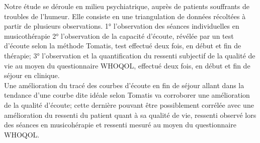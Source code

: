   Notre étude se déroule en milieu psychiatrique, 
auprès de patients souffrants de troubles de l'humeur. Elle consiste en une triangulation de données 
récoltées à partir de plusieurs observations.  
1° l'observation des séances  individuelles en musicothérapie 
2° l'observation de la capacité d'écoute, révélée par un test 
 d'écoute selon la méthode Tomatis\textsuperscript \textregistered, test effectué deux fois, en début et 
 fin de thérapie;
3° l'observation et la quantification du ressenti subjectif de la qualité de vie au moyen du 
questionnaire WHOQOL, effectué deux fois, en début et fin de séjour en clinique.
\\
Une amélioration du tracé des courbes d'écoute en fin de séjour allant dans la tendance d'une courbe 
dite idéale selon Tomatis va corroborer une amélioration de la qualité d'écoute; cette dernière pouvant 
être 
possiblement corrélée avec une amélioration du ressenti du patient quant à sa qualité de vie, ressenti 
observé lors des séances en musicohérapie et ressenti 
mesuré au moyen du questionnaire WHOQOL.









